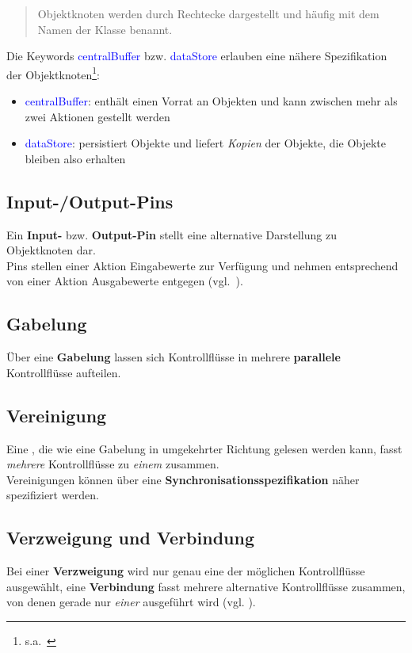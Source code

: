 \blockquote[{\cite[73]{Bal05}}]{
    Objektknoten werden durch Rechtecke dargestellt und häufig mit dem Namen der Klasse benannt.
}

\noindent
Die Keywords \textcolor{blue}{\guillemotleft centralBuffer\guillemotright} bzw. \textcolor{blue}{\guillemotleft dataStore\guillemotright} erlauben eine nähere Spezifikation der Objektknoten\footnote{s.a.~\cite[398 f.]{OMG17}}:

\begin{itemize}
    \item \textcolor{blue}{\guillemotleft centralBuffer\guillemotright}: enthält einen Vorrat an Objekten und kann zwischen mehr als zwei Aktionen gestellt werden
    \item \textcolor{blue}{\guillemotleft dataStore\guillemotright}: persistiert Objekte und liefert \textit{Kopien} der Objekte, die Objekte bleiben also erhalten
\end{itemize}

\subsection{Input-/Output-Pins}
Ein \textbf{Input-} bzw. \textbf{Output-Pin} stellt eine alternative Darstellung zu Objektknoten dar.\\
Pins stellen einer Aktion Eingabewerte zur Verfügung und nehmen entsprechend von einer Aktion Ausgabewerte entgegen (vgl.~\cite[73 f.]{Bal05}).

\subsection{Gabelung}
Über eine \textbf{Gabelung} lassen sich Kontrollflüsse in mehrere \textbf{parallele} Kontrollflüsse aufteilen.

\subsection{Vereinigung}
Eine , die wie eine Gabelung in umgekehrter Richtung gelesen werden kann, fasst \textit{mehrere} Kontrollflüsse zu \textit{einem} zusammen.\\
Vereinigungen können über eine \textbf{Synchronisationsspezifikation} näher spezifiziert werden.

\subsection{Verzweigung und Verbindung}
Bei einer \textbf{Verzweigung} wird nur genau eine der möglichen Kontrollflüsse ausgewählt, eine \textbf{Verbindung} fasst mehrere alternative  Kontrollflüsse zusammen, von denen gerade nur \textit{einer} ausgeführt wird (vgl. \cite[60]{Buh09}).

